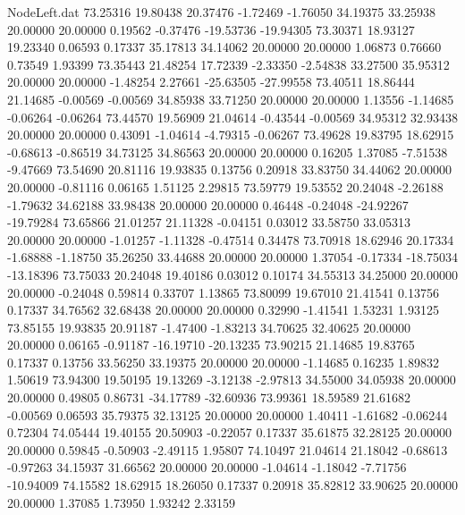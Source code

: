 \begin{filecontents}{NodeLeft.dat}
  73.25316   19.80438   20.37476    -1.72469   -1.76050   34.19375   33.25938   20.00000   20.00000    0.19562   -0.37476  -19.53736  -19.94305
  73.30371   18.93127   19.23340     0.06593    0.17337   35.17813   34.14062   20.00000   20.00000    1.06873    0.76660    0.73549    1.93399
  73.35443   21.48254   17.72339    -2.33350   -2.54838   33.27500   35.95312   20.00000   20.00000   -1.48254    2.27661  -25.63505  -27.99558
  73.40511   18.86444   21.14685    -0.00569   -0.00569   34.85938   33.71250   20.00000   20.00000    1.13556   -1.14685   -0.06264   -0.06264
  73.44570   19.56909   21.04614    -0.43544   -0.00569   34.95312   32.93438   20.00000   20.00000    0.43091   -1.04614   -4.79315   -0.06267
  73.49628   19.83795   18.62915    -0.68613   -0.86519   34.73125   34.86563   20.00000   20.00000    0.16205    1.37085   -7.51538   -9.47669
  73.54690   20.81116   19.93835     0.13756    0.20918   33.83750   34.44062   20.00000   20.00000   -0.81116    0.06165    1.51125    2.29815
  73.59779   19.53552   20.24048    -2.26188   -1.79632   34.62188   33.98438   20.00000   20.00000    0.46448   -0.24048  -24.92267  -19.79284
  73.65866   21.01257   21.11328    -0.04151    0.03012   33.58750   33.05313   20.00000   20.00000   -1.01257   -1.11328   -0.47514    0.34478
  73.70918   18.62946   20.17334    -1.68888   -1.18750   35.26250   33.44688   20.00000   20.00000    1.37054   -0.17334  -18.75034  -13.18396
  73.75033   20.24048   19.40186     0.03012    0.10174   34.55313   34.25000   20.00000   20.00000   -0.24048    0.59814    0.33707    1.13865
  73.80099   19.67010   21.41541     0.13756    0.17337   34.76562   32.68438   20.00000   20.00000    0.32990   -1.41541    1.53231    1.93125
  73.85155   19.93835   20.91187    -1.47400   -1.83213   34.70625   32.40625   20.00000   20.00000    0.06165   -0.91187  -16.19710  -20.13235
  73.90215   21.14685   19.83765     0.17337    0.13756   33.56250   33.19375   20.00000   20.00000   -1.14685    0.16235    1.89832    1.50619
  73.94300   19.50195   19.13269    -3.12138   -2.97813   34.55000   34.05938   20.00000   20.00000    0.49805    0.86731  -34.17789  -32.60936
  73.99361   18.59589   21.61682    -0.00569    0.06593   35.79375   32.13125   20.00000   20.00000    1.40411   -1.61682   -0.06244    0.72304
  74.05444   19.40155   20.50903    -0.22057    0.17337   35.61875   32.28125   20.00000   20.00000    0.59845   -0.50903   -2.49115    1.95807
  74.10497   21.04614   21.18042    -0.68613   -0.97263   34.15937   31.66562   20.00000   20.00000   -1.04614   -1.18042   -7.71756  -10.94009
  74.15582   18.62915   18.26050     0.17337    0.20918   35.82812   33.90625   20.00000   20.00000    1.37085    1.73950    1.93242    2.33159

\end{filecontents}
